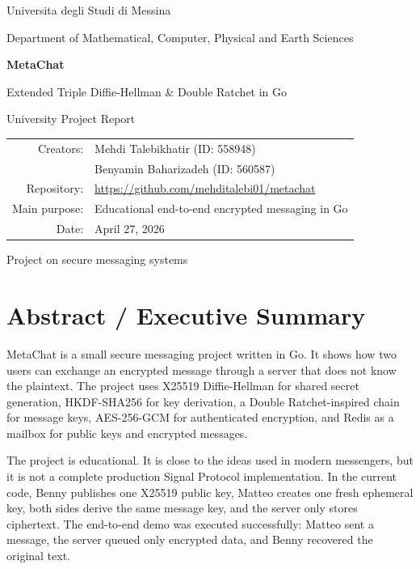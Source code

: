 \documentclass[12pt,a4paper]{article}
\begin{document}
\begin{titlepage}
    \centering
    {\Large Universita degli Studi di Messina\par}
    \vspace{0.2cm}
    {\large Department of Mathematical, Computer, Physical and Earth Sciences\par}
    \vspace{1.8cm}
    {\Huge\bfseries MetaChat\par}
    \vspace{0.35cm}
    {\LARGE Extended Triple Diffie-Hellman \& Double Ratchet in Go\par}
    \vspace{1.2cm}
    {\large University Project Report\par}
    \vspace{1.5cm}
    \begin{tabular}{rl}
        Creators: & Mehdi Talebikhatir (ID: 558948) \\
                  & Benyamin Baharizadeh (ID: 560587) \\
        Repository: & \url{https://github.com/mehditalebi01/metachat} \\
        Main purpose: & Educational end-to-end encrypted messaging in Go \\
        Date: & April 27, 2026
    \end{tabular}
    \vfill
    {\large Project on secure messaging systems\par}
\end{titlepage}

\tableofcontents
\newpage

\section*{Abstract / Executive Summary}

MetaChat is a small secure messaging project written in Go. It shows how two users can exchange an encrypted message through a server that does not know the plaintext. The project uses X25519 Diffie-Hellman for shared secret generation, HKDF-SHA256 for key derivation, a Double Ratchet-inspired chain for message keys, AES-256-GCM for authenticated encryption, and Redis as a mailbox for public keys and encrypted messages.

The project is educational. It is close to the ideas used in modern messengers, but it is not a complete production Signal Protocol implementation. In the current code, Benny publishes one X25519 public key, Matteo creates one fresh ephemeral key, both sides derive the same message key, and the server only stores ciphertext. The end-to-end demo was executed successfully: Matteo sent a message, the server queued only encrypted data, and Benny recovered the original text.
\end{document}
